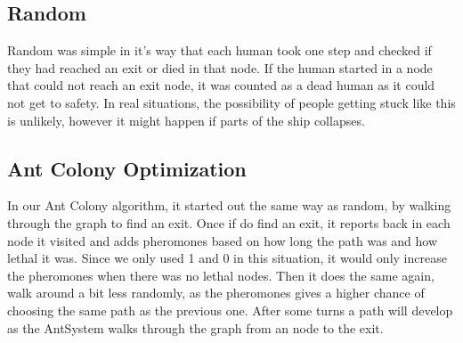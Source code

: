 \subsection{Random}
Random was simple in it's way that each human took one step and checked if they had reached an exit or died in that node. If the human started in a node that could not reach an exit node, it was counted as a dead human as it could not get to safety. In real situations, the possibility of people getting stuck like this is unlikely, however it might happen if parts of the ship collapses.

\subsection{Ant Colony Optimization}
In our Ant Colony algorithm, it started out the same way as random, by walking through the graph to find an exit. Once if do find an exit, it reports back in each node it visited and adds pheromones based on how long the path was and how lethal it was. Since we only used 1 and 0 in this situation, it would only increase the pheromones when there was no lethal nodes. Then it does the same again, walk around a bit less randomly, as the pheromones gives a higher chance of choosing the same path as the previous one. After some turns a path will develop as the AntSystem walks through the graph from an node to the exit.












